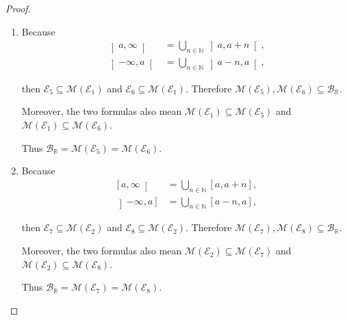 \begin{proof}
\begin{enumerate}[itemsep=0pt]
              then \( \mathcal{M}(\mathcal{E}_{2}) \subseteq \mathcal{M}(\mathcal{E}_{3}) \) and \( \mathcal{M}(\mathcal{E}_{2}) \subseteq \mathcal{M}(\mathcal{E}_{4}) \) and \( \mathcal{M}(\mathcal{E}_{2}) \supseteq \mathcal{M}(\mathcal{E}_{3}) \) and \( \mathcal{M}(\mathcal{E}_{2}) \supseteq \mathcal{M}(\mathcal{E}_{4}) \).

              Thus \( \mathcal{B}_{\mathbb{R}} = \mathcal{M}(\mathcal{E}_{3}) = \mathcal{M}(\mathcal{E}_{4}) \).
        \item[(d)] Because
              \begingroup
              \allowdisplaybreaks%
              \begin{align*}
                  \left\rbrack a, \infty \right\lbrack  & = \bigcup_{n \in \mathbb{N}} \left\rbrack a, a + n \right\lbrack, \\
                  \left\rbrack -\infty, a \right\lbrack & = \bigcup_{n \in \mathbb{N}} \left\rbrack a - n, a \right\lbrack,
              \end{align*}
              \endgroup

              then \( \mathcal{E}_{5} \subseteq \mathcal{M}(\mathcal{E}_{1}) \) and \( \mathcal{E}_{6} \subseteq \mathcal{M}(\mathcal{E}_{1}) \). Therefore \( \mathcal{M}(\mathcal{E}_{5}), \mathcal{M}(\mathcal{E}_{6}) \subseteq \mathcal{B}_{\mathbb{R}} \).

              Moreover, the two formulas also mean \( \mathcal{M}(\mathcal{E}_{1}) \subseteq \mathcal{M}(\mathcal{E}_{5}) \) and \( \mathcal{M}(\mathcal{E}_{1}) \subseteq \mathcal{M}(\mathcal{E}_{6}) \).

              Thus \( \mathcal{B}_{\mathbb{R}} = \mathcal{M}(\mathcal{E}_{5}) = \mathcal{M}(\mathcal{E}_{6}) \).
        \item[(e)] Because
              \begingroup
              \allowdisplaybreaks%
              \begin{align*}
                  \left\lbrack a, \infty \right\lbrack  & = \bigcup_{n \in \mathbb{N}} \left\lbrack a, a + n \right\rbrack, \\
                  \left\rbrack -\infty, a \right\rbrack & = \bigcup_{n \in \mathbb{N}} \left\lbrack a - n, a \right\rbrack,
              \end{align*}
              \endgroup

              then \( \mathcal{E}_{7} \subseteq \mathcal{M}(\mathcal{E}_{2}) \) and \( \mathcal{E}_{8} \subseteq \mathcal{M}(\mathcal{E}_{2}) \). Therefore \( \mathcal{M}(\mathcal{E}_{7}), \mathcal{M}(\mathcal{E}_{8}) \subseteq \mathcal{B}_{\mathbb{R}} \).

              Moreover, the two formulas also mean \( \mathcal{M}(\mathcal{E}_{2}) \subseteq \mathcal{M}(\mathcal{E}_{7}) \) and \( \mathcal{M}(\mathcal{E}_{2}) \subseteq \mathcal{M}(\mathcal{E}_{8}) \).

              Thus \( \mathcal{B}_{\mathbb{R}} = \mathcal{M}(\mathcal{E}_{7}) = \mathcal{M}(\mathcal{E}_{8}) \).
    \end{enumerate}
\end{proof}

